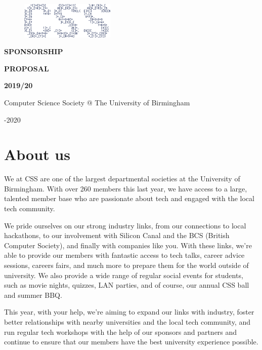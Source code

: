 \documentclass{article}
\begin{document}

\begin{figure}
  \includegraphics[width=0.4\textwidth]{CSS_Logo}
\end{figure}

\vspace*{0.1cm}

\fontsize{56}{50}\selectfont

\noindent\textbf{SPONSORSHIP}
\par
\noindent\textbf{PROPOSAL}
\par
\noindent\textbf{2019/20}

\fontsize{13}{18}\selectfont
\vspace{0.5cm}
\noindent Computer Science Society @ The University of Birmingham \par
{}-2020

\newpage

\section*{About us}

We at CSS are one of the largest departmental societies at the University of Birmingham. With over 260 members this last year, we have access to a large, talented member base who are passionate about tech and engaged with the local tech community.

\vspace{1cm}

We pride ourselves on our strong industry links, from our connections to local hackathons, to our involvement with Silicon Canal and the BCS (British Computer Society), and finally with companies like you.
With these links, we're able to provide our members with fantastic access to tech talks, career advice sessions, careers fairs, and much more to prepare them for the world outside of university.
We also provide a wide range of regular social events for students, such as movie nights, quizzes, LAN parties, and of course, our annual CSS ball and summer BBQ.

\vspace{1cm}

This year, with your help, we're aiming to expand our links with industry, foster better relationships with nearby universities and the local tech community, and run regular tech workshops with the help of our sponsors and partners and continue to ensure that our members have the best university experience possible.
\end{document}
